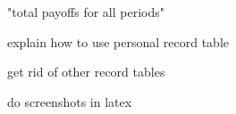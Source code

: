 "total payoffs for all periods"

explain how to use personal record table

get rid of other record tables

do screenshots in latex

